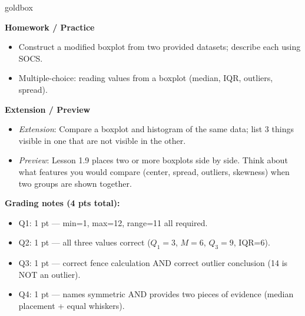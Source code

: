 \documentclass[10pt]{article}
\begin{document}
\boxguard
\begin{skillbox}{goldbox}
\begin{minipage}[t]{0.48\linewidth}
    \textbf{Homework / Practice}
    \begin{itemize}
        \item Construct a modified boxplot from two provided datasets; describe each using SOCS.
        \item Multiple-choice: reading values from a boxplot (median, IQR, outliers, spread).
    \end{itemize}
\end{minipage}
\hfill
\begin{minipage}[t]{0.48\linewidth}
    \textbf{Extension / Preview}
    \begin{itemize}
        \item \textit{Extension}: Compare a boxplot and histogram of the same data; list 3 things visible in one that are not visible in the other.
        \item \textit{Preview}: Lesson 1.9 places two or more boxplots side by side. Think about what features you would compare (center, spread, outliers, skewness) when two groups are shown together.
    \end{itemize}
\end{minipage}
\end{skillbox}



\boxguard
\begin{teachernote}[Warm-Up]
\textbf{Grading notes (4 pts total):}
\begin{itemize}[itemsep=2pt]
  \item Q1: 1 pt — min=1, max=12, range=11 all required.
  \item Q2: 1 pt — all three values correct ($Q_1=3$, $M=6$, $Q_3=9$, IQR=6).
  \item Q3: 1 pt — correct fence calculation AND correct outlier conclusion (14 is NOT an outlier).
  \item Q4: 1 pt — names symmetric AND provides two pieces of evidence (median placement + equal whiskers).
\end{itemize}
\end{teachernote}
\end{document}
